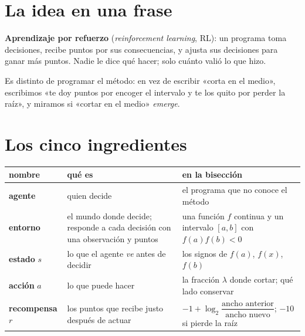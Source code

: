 
\newcommand{\docpie}{Laboratorio 1 · teoría mínima de RL}
\usepackage{listings}


\section{La idea en una frase}

\textbf{Aprendizaje por refuerzo} (\emph{reinforcement learning}, RL): un programa toma decisiones, recibe puntos por sus consecuencias, y ajusta sus decisiones para ganar más puntos. Nadie le dice qué hacer; solo cuánto valió lo que hizo.

Es distinto de programar el método: en vez de escribir «corta en el medio», escribimos «te doy puntos por encoger el intervalo y te los quito por perder la raíz», y miramos si «cortar en el medio» \emph{emerge}.

\section{Los cinco ingredientes}

\begin{tabularx}{\linewidth}{@{}l X X@{}}
\toprule
\textbf{nombre} & \textbf{qué es} & \textbf{en la bisección} \\
\midrule
\textbf{agente} & quien decide & el programa que no conoce el método \\
\textbf{entorno} & el mundo donde decide; responde a cada decisión con una observación y puntos & una función $f$ continua y un intervalo $[a,b]$ con $f(a)f(b)<0$ \\
\textbf{estado} $s$ & lo que el agente \emph{ve} antes de decidir & los signos de $f(a)$, $f(x)$, $f(b)$ \\
\textbf{acción} $a$ & lo que puede hacer & la fracción $\lambda$ donde cortar; qué lado conservar \\
\textbf{recompensa} $r$ & los puntos que recibe justo después de actuar & $-1 + \log_2\dfrac{\text{ancho anterior}}{\text{ancho nuevo}}$; $-10$ si pierde la raíz \\
\bottomrule
\end{tabularx}


